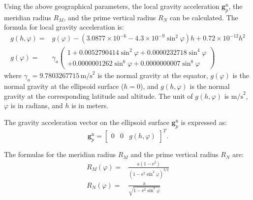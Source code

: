 \documentclass{article}
\begin{document}
Using the above geographical parameters, the local gravity acceleration $\boldsymbol{g}_{p}^{\mathrm{n}}$, the meridian radius $R_{M}$, and the prime vertical radius $R_{N}$ can be calculated. The formula for local gravity acceleration is:
\begin{equation}
    \begin{aligned}
        g(h,\varphi) =& g(\varphi) -\left(3.0877 \times 10^{-6} - 4.3\times10^{-9} \sin^{2}\varphi \right) h + 0.72\times 10^{-12} h^{2} \\
        g(\varphi) =& \gamma_{a} \left( \begin{matrix}1 + 0.0052790414 \sin^{2}\varphi + 0.0000232718 \sin^{4}\varphi \\ + 0.0000001262 \sin^{6}\varphi + 0.0000000007 \sin^{8} \varphi \end{matrix} \right)
    \end{aligned}
\end{equation}
where $\gamma_{a}=9.7803267715 \, \text{m/s}^2$ is the normal gravity at the equator, $g(\varphi)$ is the normal gravity at the ellipsoid surface ($h=0$), and $g(h,\varphi)$ is the normal gravity at the corresponding latitude and altitude. The unit of $g(h,\varphi)$ is $\text{m/s}^2$, $\varphi$ is in radians, and $h$ is in meters.

The gravity acceleration vector on the ellipsoid surface $\boldsymbol{g}_{p}^{\mathrm{n}}$ is expressed as:
\begin{equation}
    \boldsymbol{g}_{p}^{\mathrm{n}} = \left[ \begin{matrix} 0 & 0 & g(h,\varphi) \end{matrix}  \right]^{T}.
    \label{eq:local-gravity-in-n-frame}
\end{equation}

The formulas for the meridian radius $R_{M}$ and the prime vertical radius $R_{N}$ are:
\begin{equation}
    \begin{aligned}
        {R}_{M}\left( \varphi \right) =& \frac{\text{a} \left(1 - {\text{e}}^2 \right)}{\left( 1 - {\text{e}}^2 \sin^2 \varphi \right) ^{3/2}} \\ 
        {R}_{N}\left( \varphi \right) =& \frac{\text{a}}{\sqrt{1 - {\text{e}}^2 \sin^2 \varphi}}
    \end{aligned}
    \label{eq:radius-of-earth-curvature}
\end{equation}
\end{document}
